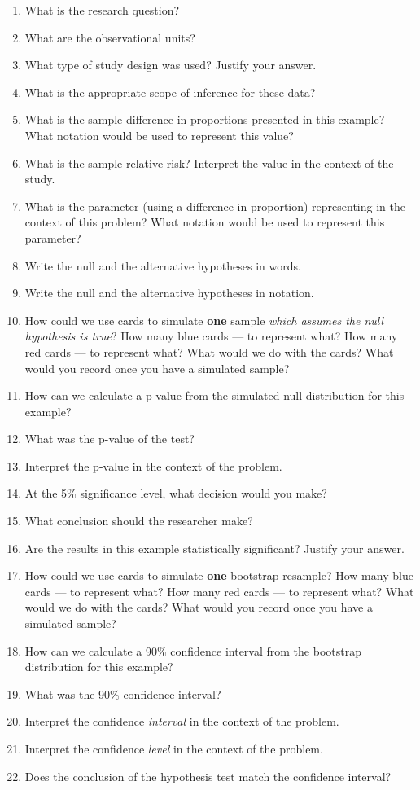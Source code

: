 \documentclass[
]{report}
\newcommand{\rgs}{\vspace{12pt}} %
\begin{document}
\begin{enumerate}
\def\labelenumi{\arabic{enumi}.}
\item
  What is the research question?
  \rgs
\item
  What are the observational units?
  \rgs
\item
  What type of study design was used? Justify your answer.
  \rgs
\item
  What is the appropriate scope of inference for these data?
  \rgs
\item
  What is the sample difference in proportions presented in this example? What notation would be used to represent this value?
  \rgs
\item
  What is the sample relative risk? Interpret the value in the context of the study.
  \rgs
  \rgs
\item
  What is the parameter (using a difference in proportion) representing in the context of this problem? What notation would be used to represent this parameter?
  \rgs
  \rgs
\item
  Write the null and the alternative hypotheses in words.
  \rgs
  \rgs
\item
  Write the null and the alternative hypotheses in notation.
  \rgs
\item
  How could we use cards to simulate \textbf{one} sample \emph{which assumes the null hypothesis is true}? How many blue cards --- to represent what? How many red cards --- to represent what? What would we do with the cards? What would you record once you have a simulated sample?
  \rgs
  \rgs
  \rgs
\item
  How can we calculate a p-value from the simulated null distribution for this example?
  \rgs
  \rgs
\item
  What was the p-value of the test?
  \rgs
\item
  Interpret the p-value in the context of the problem.
  \rgs
  \rgs
\item
  At the 5\% significance level, what decision would you make?
  \rgs
\item
  What conclusion should the researcher make?
  \rgs
  \rgs
\item
  Are the results in this example statistically significant? Justify your answer.
  \rgs
\item
  How could we use cards to simulate \textbf{one} bootstrap resample? How many blue cards --- to represent what? How many red cards --- to represent what? What would we do with the cards? What would you record once you have a simulated sample?
  \rgs
  \rgs
  \rgs
\item
  How can we calculate a 90\% confidence interval from the bootstrap distribution for this example?
  \rgs
\item
  What was the 90\% confidence interval?
  \rgs
\item
  Interpret the confidence \emph{interval} in the context of the problem.
  \rgs
  \rgs
\item
  Interpret the confidence \emph{level} in the context of the problem.
  \rgs
  \rgs
\item
  Does the conclusion of the hypothesis test match the confidence interval?
  \rgs
\end{enumerate}
\end{document}
